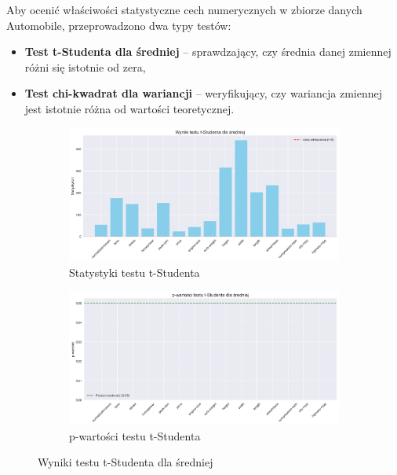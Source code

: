 \documentclass[12pt,a4paper]{article}
\begin{document}
Aby ocenić właściwości statystyczne cech numerycznych w zbiorze danych Automobile, przeprowadzono dwa typy testów:
\begin{itemize}
    \item \textbf{Test t-Studenta dla średniej} – sprawdzający, czy średnia danej zmiennej różni się istotnie od zera,
    \item \textbf{Test chi-kwadrat dla wariancji} – weryfikujący, czy wariancja zmiennej jest istotnie różna od wartości teoretycznej.
\end{itemize}

\begin{figure}[H]
    \centering
    \begin{subfigure}[b]{0.48\textwidth}
        \includegraphics[width=\textwidth]{figures/ttest_statistics.png}
        \caption{Statystyki testu t-Studenta}
    \end{subfigure}
    \hfill
    \begin{subfigure}[b]{0.48\textwidth}
        \includegraphics[width=\textwidth]{figures/ttest_pvalues.png}
        \caption{p-wartości testu t-Studenta}
    \end{subfigure}
    \caption{Wyniki testu t-Studenta dla średniej}
    \label{fig:ttest_results}
\end{figure}
\end{document}
